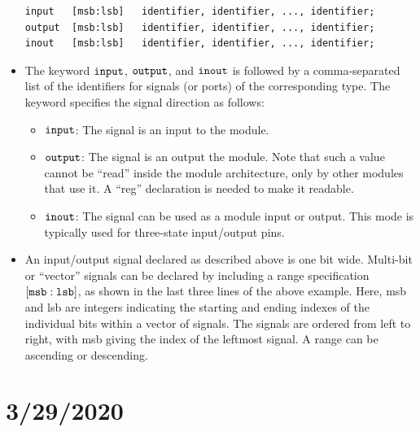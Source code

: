 \documentclass[10pt,a4paper]{article}
\begin{document}
\begin{itemize}
\begin{lstlisting}
input	[msb:lsb]	identifier, identifier, ..., identifier;
output	[msb:lsb]	identifier, identifier, ..., identifier;
inout	[msb:lsb]	identifier, identifier, ..., identifier;
\end{lstlisting}
\item The keyword $\tt{input}$, $\tt{output}$, and $\tt{inout}$ is followed by a comma-separated list of the identifiers for signals (or ports) of the corresponding type. The keyword specifies the signal direction as follows:
\begin{itemize}
\item $\tt{input}$: The signal is an input to the module.
\item $\tt{output}$: The signal is an output the module. Note that such a value cannot be ``read'' inside the module architecture, only by other modules that use it. A ``reg'' declaration is needed to make it readable.
\item $\tt{inout}$: The signal can be used as a module input or output. This mode is typically used for three-state input/output pins.
\end{itemize}
\item An input/output signal declared as described above is one bit wide. Multi-bit or ``vector'' signals can be declared by including a range specification $\tt{[msb:lsb]}$, as shown in the last three lines of the above example. Here, msb and lsb are integers indicating the starting and ending indexes of the individual bits within a vector of signals. The signals are ordered from left to right, with msb giving the index of the leftmost signal. A range can be ascending or descending. 
\end{itemize}
\pagebreak
\section{3/29/2020}
\end{document}
